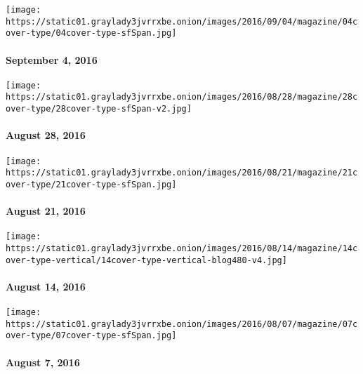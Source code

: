 \href{http://www.nytimes3xbfgragh.onion/indexes/2016/09/04/magazine/index.html}{}

\texttt{[image: https://static01.graylady3jvrrxbe.onion/images/2016/09/04/magazine/04cover-type/04cover-type-sfSpan.jpg]}

\hypertarget{september-4-2016}{%
\paragraph{September 4, 2016}\label{september-4-2016}}

\href{http://www.nytimes3xbfgragh.onion/indexes/2016/08/28/magazine/index.html}{}

\texttt{[image: https://static01.graylady3jvrrxbe.onion/images/2016/08/28/magazine/28cover-type/28cover-type-sfSpan-v2.jpg]}

\hypertarget{august-28-2016}{%
\paragraph{August 28, 2016}\label{august-28-2016}}

\href{http://www.nytimes3xbfgragh.onion/indexes/2016/08/21/magazine/index.html}{}

\texttt{[image: https://static01.graylady3jvrrxbe.onion/images/2016/08/21/magazine/21cover-type/21cover-type-sfSpan.jpg]}

\hypertarget{august-21-2016}{%
\paragraph{August 21, 2016}\label{august-21-2016}}

\href{http://www.nytimes3xbfgragh.onion/indexes/2016/08/14/magazine/index.html}{}

\texttt{[image: https://static01.graylady3jvrrxbe.onion/images/2016/08/14/magazine/14cover-type-vertical/14cover-type-vertical-blog480-v4.jpg]}

\hypertarget{august-14-2016}{%
\paragraph{August 14, 2016}\label{august-14-2016}}

\href{http://www.nytimes3xbfgragh.onion/indexes/2016/08/07/magazine/index.html}{}

\texttt{[image: https://static01.graylady3jvrrxbe.onion/images/2016/08/07/magazine/07cover-type/07cover-type-sfSpan.jpg]}

\hypertarget{august-7-2016}{%
\paragraph{August 7, 2016}\label{august-7-2016}}

